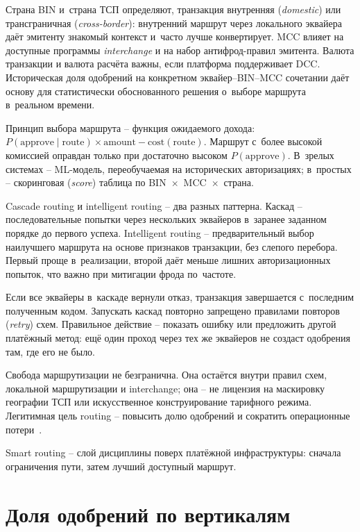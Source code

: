 Страна BIN и~страна ТСП определяют, транзакция внутренняя (\textit{domestic})
или трансграничная (\textit{cross-border}): внутренний маршрут через локального
эквайера даёт эмитенту знакомый контекст и~часто лучше конвертирует.
MCC влияет на доступные программы \textit{interchange} и на набор
антифрод-правил эмитента. Валюта транзакции и валюта расчёта
важны, если платформа поддерживает DCC. Историческая доля одобрений
на конкретном эквайер--BIN--MCC сочетании даёт основу для
статистически обоснованного решения о~выборе маршрута в~реальном
времени.

Принцип выбора маршрута -- функция ожидаемого дохода:
$P(\text{approve} \mid \text{route}) \times \text{amount} -
\text{cost}(\text{route})$. Маршрут с~более высокой комиссией
оправдан только при достаточно высоком $P(\text{approve})$. В~зрелых
системах -- ML-модель, переобучаемая на исторических авторизациях;
в~простых -- скоринговая (\textit{score}) таблица по BIN~$\times$~MCC~$\times$~страна.

Cascade routing и intelligent routing -- два разных паттерна.
Каскад -- последовательные попытки через нескольких эквайеров
в~заранее заданном порядке до первого успеха. Intelligent routing --
предварительный выбор наилучшего маршрута на основе признаков
транзакции, без слепого перебора. Первый проще в~реализации, второй
даёт меньше лишних авторизационных попыток, что важно при митигации
фрода по~частоте.

Если все эквайеры в~каскаде вернули отказ, транзакция завершается
с~последним полученным кодом. Запускать каскад повторно запрещено
правилами повторов (\textit{retry}) схем. Правильное действие -- показать ошибку или
предложить другой платёжный метод: ещё один проход через тех же
эквайеров не создаст одобрения там, где его не было.

Свобода маршрутизации не безгранична. Она остаётся внутри
правил схем, локальной маршрутизации и interchange; она -- не лицензия
на маскировку географии ТСП или искусственное
конструирование тарифного режима. Легитимная цель routing --
повысить долю одобрений и сократить операционные
потери~\cite{visa-core-rules,mc-rules,mc-tpr}.

Smart routing -- слой дисциплины поверх платёжной
инфраструктуры: сначала ограничения пути, затем лучший доступный маршрут.

\section{Доля одобрений по вертикалям}\label{sec:decline-benchmarks}

